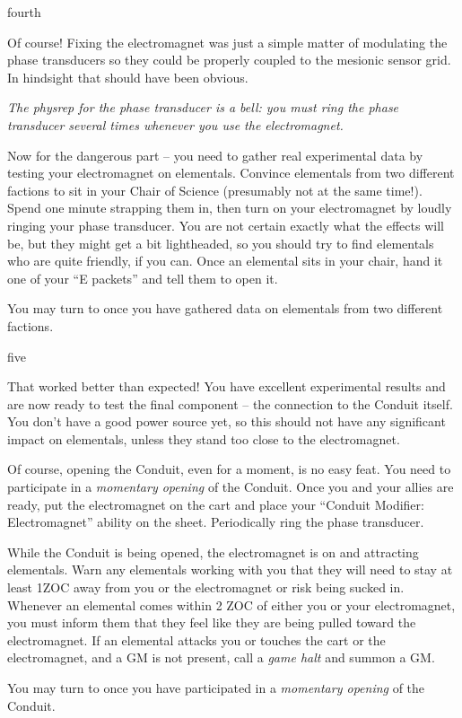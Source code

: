 \documentclass[notebook]{elementals}
\begin{document}
\begin{page}{fourth}

Of course! Fixing the electromagnet was just a simple matter of modulating the phase transducers so they could be properly coupled to the mesionic sensor grid. In hindsight that should have been obvious.

\emph{The physrep for the phase transducer is a bell: you must ring the phase transducer several times whenever you use the electromagnet.}

Now for the dangerous part -- you need to gather real experimental data by testing your electromagnet on elementals. Convince elementals from two different factions to sit in your Chair of Science (presumably not at the same time!). Spend one minute strapping them in, then turn on your electromagnet by loudly ringing your phase transducer. You are not certain exactly what the effects will be, but they might get a bit lightheaded, so you should try to find elementals who are quite friendly, if you can. Once an elemental sits in your chair, hand it one of your ``E packets'' and tell them to open it.

You may turn to  once you have gathered data on elementals from two different factions.

\end{page}

\begin{page}{five}

That worked better than expected! You have excellent experimental results and are now ready to test the final component -- the connection to the Conduit itself. You don't have a good power source yet, so this should not have any significant impact on elementals, unless they stand too close to the electromagnet.

Of course, opening the Conduit, even for a moment, is no easy feat. You need to participate in a \emph{momentary opening} of the Conduit. Once you and your allies are ready, put the electromagnet on the cart and place your ``Conduit Modifier: Electromagnet'' ability on the sheet. Periodically ring the phase transducer.

While the Conduit is being opened, the electromagnet is on and attracting elementals. Warn any elementals working with you that they will need to stay at least 1ZOC away from you or the electromagnet or risk being sucked in. Whenever an elemental comes within 2 ZOC of either you or your electromagnet, you must inform them that they feel like they are being pulled toward the electromagnet. If an elemental attacks you or touches the cart or the electromagnet, and a GM is not present, call a \emph{game halt} and summon a GM.

You may turn to  once you have participated in a \emph{momentary opening} of the Conduit.

\end{page}
\end{document}
